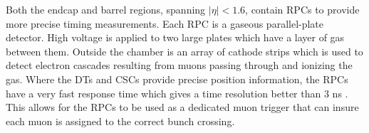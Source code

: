 Both the endcap and barrel regions, spanning  $|\eta|<1.6$, contain RPCs to provide more precise timing measurements.  Each RPC is a gaseous parallel-plate detector.  High voltage is applied to two large plates which have a layer of gas between them.  Outside the chamber is an array of cathode strips which is used to detect electron cascades resulting from muons passing through and ionizing the gas.  Where the DTs and CSCs provide precise position information, the RPCs have a very fast response time which gives a time resolution better than 3 ns \cite{Sirunyan_2018}.  This allows for the RPCs to be used as a dedicated muon trigger that can insure each muon is assigned to the correct bunch crossing.
